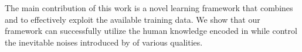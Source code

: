 The main contribution of this work is a novel learning framework that combines \REs and \NNs to effectively exploit the available training
data. We show that our framework can successfully utilize the human knowledge encoded in \REs while control the inevitable noises
introduced by \REs of various qualities.


